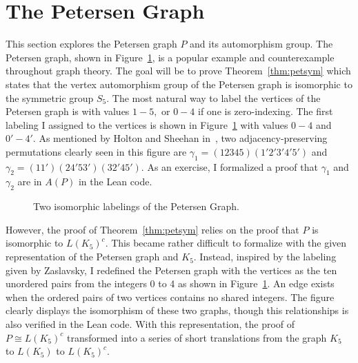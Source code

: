 \documentclass{article}
\begin{document}
\section{The Petersen Graph}\label{sec:pet}
This section explores the Petersen graph $P$ and its automorphism group. The Petersen graph, shown in Figure~\ref{fig:petersen}, is a popular example and counterexample throughout graph theory. The goal will be to prove Theorem~\ref{thm:petsym} which states that the vertex automorphism group of the Petersen graph is isomorphic to the symmetric group $S_5.$ The most natural way to label the vertices of the Petersen graph is with values $1-5,$ or $0-4$ if one is zero-indexing. The first labeling I assigned to the vertices is shown in Figure~\ref{fig:petersen} with values $0-4$ and $0'-4'$. As mentioned by Holton and Sheehan in~\cite{holton}, two adjacency-preserving permutations clearly seen in this figure are $\gamma_1 = (12345)(1'2'3'4'5')$ and $\gamma_2 = (11')(24'53')(32'45').$ As an exercise, I formalized a proof that $\gamma_1$ and $\gamma_2$ are in $A(P)$ in the Lean code.

\begin{figure}
\centering
    \begin{minipage}{0.5\textwidth}
        \centering
        
    \end{minipage}%
    \begin{minipage}{0.4\textwidth}
        \centering
        
    \end{minipage}
    \label{fig:petersen}
    \caption{Two isomorphic labelings of the Petersen Graph.}
\end{figure}

However, the proof of Theorem~\ref{thm:petsym} relies on the proof that $P$ is isomorphic to $L(K_5)^c.$ This became rather difficult to formalize with the given representation of the Petersen graph and $K_5$. Instead, inspired by the labeling given by Zaslavsky, I redefined the Petersen graph with the vertices as the ten unordered pairs from the integers 0 to 4 as shown in Figure~\ref{fig:petersen}. An edge exists when the ordered pairs of two vertices contains no shared integers. The figure clearly displays the isomorphism of these two graphs, though this relationships is also verified in the Lean code. With this representation, the proof of $P \cong L(K_5)^c$ transformed into a series of short translations from the graph $K_5$ to $L(K_5)$ to $L(K_5)^c.$
\end{document}
